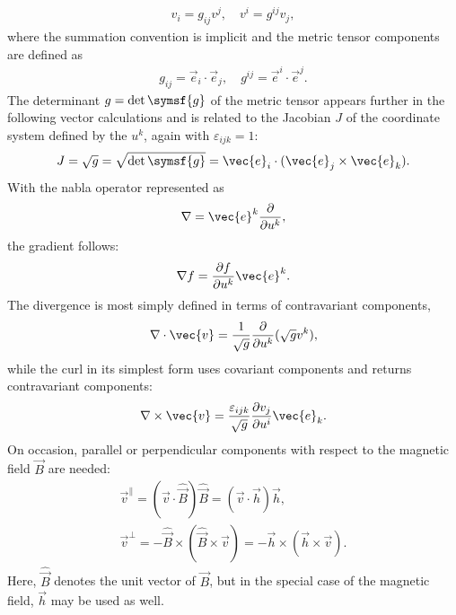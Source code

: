 \begin{gather}
  v_{i} = g_{ij} v^{j}, \quad v^{i} = g^{ij} v_{j},
\end{gather}
where the summation convention is implicit and the metric tensor components are defined as
\begin{gather}
  g_{ij} = \vec{e}_{i} \cdot \vec{e}_{j}, \quad g^{ij} = \vec{e}^{i} \cdot \vec{e}^{j}.
\end{gather}
The determinant $g = \det \symsf{g}$ of the metric tensor appears further in the following vector calculations and is related to the Jacobian $J$ of the coordinate system defined by the $u^{k}$, again with $\varepsilon_{ijk} = 1$:
\begin{gather}
  J = \sqrt{g} = \sqrt{\det \symsf{g}} = \vec{e}_{i} \cdot (\vec{e}_{j} \times \vec{e}_{k}).
\end{gather}
With the nabla operator represented as
\begin{gather}
  \nabla = \vec{e}^{k} \pd{u^{k}},
\end{gather}
the gradient follows:
\begin{gather}
  \grad f = \pd[f]{u^{k}} \vec{e}^{k}.
\end{gather}
The divergence is most simply defined in terms of contravariant components,
\begin{gather}
  \divg \vec{v} = \frac{1}{\sqrt{g}} \pd{u^{k}} (\sqrt{g} v^{k}),
\end{gather}
while the curl in its simplest form uses covariant components and returns contravariant components:
\begin{gather}
  \curl \vec{v} = \frac{\varepsilon_{ijk}}{\sqrt{g}} \pd[v_{j}]{u^{i}} \vec{e}_{k}.
\end{gather}
On occasion, parallel or perpendicular components with respect to the magnetic field $\vec{B}$ are needed:
\begin{gather}
  \vec{v}^{\parallel} = (\vec{v} \cdot \hat{\vec{B}}) \hat{\vec{B}} = (\vec{v} \cdot \vec{h}) \vec{h}, \\
  \vec{v}^{\perp} = -\hat{\vec{B}} \times (\hat{\vec{B}} \times \vec{v}) = -\vec{h} \times (\vec{h} \times \vec{v}).
\end{gather}
Here, $\hat{\vec{B}}$ denotes the unit vector of $\vec{B}$, but in the special case of the magnetic field, $\vec{h}$ may be used as well.

